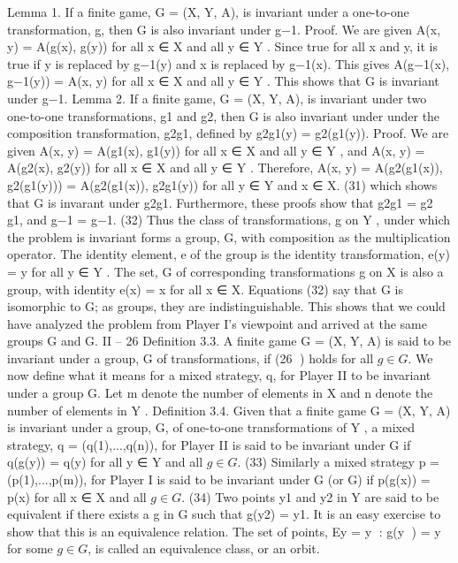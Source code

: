 Lemma 1. If a finite game, G = (X, Y, A), is invariant under a one-to-one transformation,
g, then G is also invariant under g−1.
Proof. We are given A(x, y) = A(g(x), g(y)) for all x ∈ X and all y ∈ Y . Since true for
all x and y, it is true if y is replaced by g−1(y) and x is replaced by g−1(x). This gives
A(g−1(x), g−1(y)) = A(x, y) for all x ∈ X and all y ∈ Y . This shows that G is invariant
under g−1.
Lemma 2. If a finite game, G = (X, Y, A), is invariant under two one-to-one transformations,
g1 and g2, then G is also invariant under under the composition transformation,
g2g1, defined by g2g1(y) = g2(g1(y)).
Proof. We are given A(x, y) = A(g1(x), g1(y)) for all x ∈ X and all y ∈ Y , and A(x, y) =
A(g2(x), g2(y)) for all x ∈ X and all y ∈ Y . Therefore,
A(x, y) = A(g2(g1(x)), g2(g1(y))) = A(g2(g1(x)), g2g1(y)) for all y ∈ Y and x ∈ X.
(31)
which shows that G is invarant under g2g1.
Furthermore, these proofs show that
g2g1 = g2 g1, and g−1 = g−1. (32)
Thus the class of transformations, g on Y , under which the problem is invariant forms a
group, G, with composition as the multiplication operator. The identity element, e of the
group is the identity transformation, e(y) = y for all y ∈ Y . The set, G of corresponding
transformations g on X is also a group, with identity e(x) = x for all x ∈ X. Equations
(32) say that G is isomorphic to G; as groups, they are indistinguishable.
This shows that we could have analyzed the problem from Player I’s viewpoint and
arrived at the same groups G and G.
II – 26
Definition 3.3. A finite game G = (X, Y, A) is said to be invariant under a group, G of
transformations, if (26
) holds for all $g \in G$.
We now define what it means for a mixed strategy, q, for Player II to be invariant
under a group G. Let m denote the number of elements in X and n denote the number of
elements in Y .
Definition 3.4. Given that a finite game G = (X, Y, A) is invariant under a group, G,
of one-to-one transformations of Y , a mixed strategy, q = (q(1),...,q(n)), for Player II is
said to be invariant under G if
q(g(y)) = q(y) for all y ∈ Y and all $g \in G$. (33)
Similarly a mixed strategy p = (p(1),...,p(m)), for Player I is said to be invariant under
G (or G) if
p(g(x)) = p(x) for all x ∈ X and all $g \in G$. (34)
Two points y1 and y2 in Y are said to be equivalent if there exists a g in G such that
g(y2) = y1. It is an easy exercise to show that this is an equivalence relation. The set of
points, Ey = {y : g(y
) = y for some $g \in G$}, is called an equivalence class, or an orbit.
